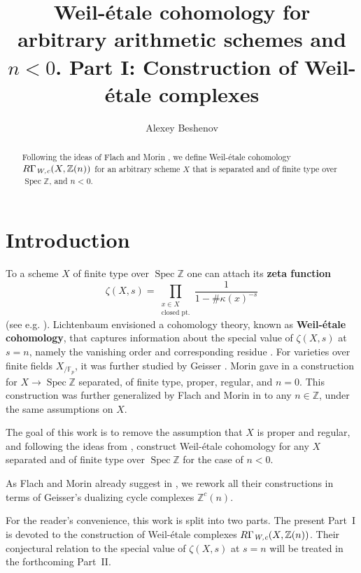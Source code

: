 \documentclass{article}
\title{Weil-étale cohomology for arbitrary arithmetic schemes and $n < 0$.
  Part I: Construction of Weil-étale complexes}
\author{Alexey Beshenov}
\DeclareMathOperator{\Spec}{Spec}
\newcommand{\FF}{\mathbb{F}}
\newcommand{\ZZ}{\mathbb{Z}}
\newcommand{\Wc}{\text{\it W,c}}
\theoremstyle{definition}
\numberwithin{equation}{section}
\begin{document}
\maketitle

\begin{abstract}
  Following the ideas of Flach and Morin \cite{Flach-Morin-2018}, we define
  Weil-étale cohomology $R\Gamma_\Wc (X, \ZZ (n))$ for an arbitrary scheme $X$
  that is separated and of finite type over $\Spec \ZZ$, and $n < 0$.
\end{abstract}

\tableofcontents


\section{Introduction}

To a scheme $X$ of finite type over $\Spec \ZZ$ one can attach its
\textbf{zeta function}
$$\zeta (X,s) = \prod_{\substack{x \in X \\ \text{closed pt.}}} \frac{1}{1 - \#\kappa (x)^{-s}}$$
(see e.g. \cite{Serre-1965}). Lichtenbaum envisioned a cohomology theory, known
as \textbf{Weil-étale cohomology}, that captures information about the special
value of $\zeta (X,s)$ at $s = n$, namely the vanishing order and corresponding
residue
\cite{Lichtenbaum-2005,Lichtenbaum-2009-number-rings,Lichtenbaum-2009-Euler-char}.
For varieties over finite fields $X_{/\FF_p}$, it was further studied by Geisser
\cite{Geisser-2004,Geisser-2006}. Morin gave in \cite{Morin-2014} a construction
for $X \to \Spec\ZZ$ separated, of finite type, proper, regular, and $n = 0$.
This construction was further generalized by Flach and Morin in
\cite{Flach-Morin-2018} to any $n \in \ZZ$, under the same assumptions on $X$.

The goal of this work is to remove the assumption that $X$ is proper and
regular, and following the ideas from \cite{Flach-Morin-2018}, construct
Weil-étale cohomology for any $X$ separated and of finite type over $\Spec\ZZ$
for the case of $n < 0$.

As Flach and Morin already suggest in \cite[Remark 3.11]{Flach-Morin-2018},
we rework all their constructions in terms of Geisser's dualizing cycle
complexes $\ZZ^c (n)$.

For the reader's convenience, this work is split into two parts. The present
Part~I is devoted to the construction of Weil-étale complexes
$R\Gamma_\Wc (X, \ZZ (n))$. Their conjectural relation to the special value
of $\zeta (X,s)$ at $s = n$ will be treated in the forthcoming Part~II.
\end{document}
